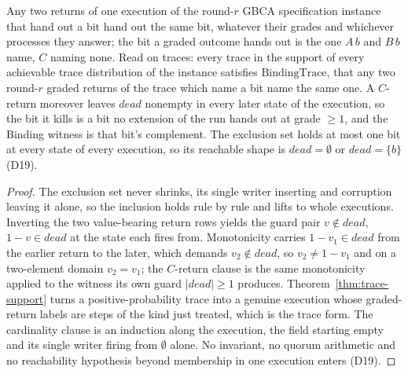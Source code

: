 \begin{theorem}
  \label{thm:gbca-spec-binding}
  \leanok
  Any two returns of one execution of the round-$r$ GBCA specification instance that hand out a bit hand out the same bit, whatever their grades and whichever processes they answer; the bit a graded outcome hands out is the one $A\,b$ and $B\,b$ name, $C$ naming none.\leanok{}
  Read on traces: every trace in the support of every achievable trace distribution of the instance satisfies $\mathrm{BindingTrace}$, that any two round-$r$ graded returns of the trace which name a bit name the same one.\leanok{}
  A $C$-return moreover leaves $dead$ nonempty in every later state of the execution, so the bit it kills is a bit no extension of the run hands out at grade $\ge 1$, and the Binding witness is that bit's complement.\leanok{}
  The exclusion set holds at most one bit at every state of every execution, so its reachable shape is $dead = \emptyset$ or $dead = \{b\}$ (D19).\leanok{}
\end{theorem}

\begin{proof}\leanok
  The exclusion set never shrinks, its single writer inserting and corruption leaving it alone, so the inclusion holds rule by rule and lifts to whole executions.\leanok{}
  Inverting the two value-bearing return rows yields the guard pair $v \notin dead$, $1-v \in dead$ at the state each fires from.\leanok{}
  Monotonicity carries $1-v_1 \in dead$ from the earlier return to the later, which demands $v_2 \notin dead$, so $v_2 \neq 1-v_1$ and on a two-element domain $v_2 = v_1$; the $C$-return clause is the same monotonicity applied to the witness its own guard $|dead| \ge 1$ produces.
  Theorem~\ref{thm:trace-support} turns a positive-probability trace into a genuine execution whose graded-return labels are steps of the kind just treated, which is the trace form.
  The cardinality clause is an induction along the execution, the field starting empty and its single writer firing from $\emptyset$ alone.\leanok{}
  No invariant, no quorum arithmetic and no reachability hypothesis beyond membership in one execution enters (D19).
\end{proof}

